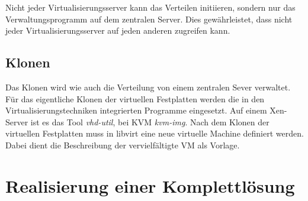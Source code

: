 Nicht jeder Virtualisierungsserver kann das Verteilen initiieren, sondern nur das Verwaltungsprogramm auf dem zentralen Server. Dies gewährleistet, dass nicht jeder Virtualisierungsserver auf jeden anderen zugreifen kann.

\subsection{Klonen}
Das Klonen wird wie auch die Verteilung von einem zentralen Sever verwaltet. Für das eigentliche Klonen der virtuellen Festplatten werden die in den Virtualisierungstechniken integrierten Programme eingesetzt. Auf einem Xen-Server ist es das Tool \textit{vhd-util}, bei KVM \textit{kvm-img}. Nach dem Klonen der virtuellen Festplatten muss in libvirt eine neue virtuelle Machine definiert werden. Dabei dient die Beschreibung der vervielfältigte VM als Vorlage.

\section{Realisierung einer Komplettlösung} 
